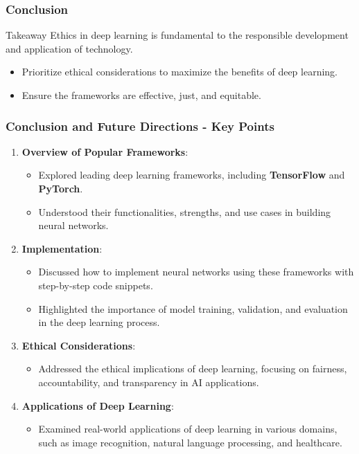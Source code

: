 \documentclass[aspectratio=169]{beamer}
\begin{document}
\begin{frame}[fragile]
    \frametitle{Conclusion}
    \begin{block}{Takeaway}
        Ethics in deep learning is fundamental to the responsible development and application of technology. 
        \begin{itemize}
            \item Prioritize ethical considerations to maximize the benefits of deep learning.
            \item Ensure the frameworks are effective, just, and equitable.
        \end{itemize}
    \end{block}
\end{frame}

\begin{frame}[fragile]
    \frametitle{Conclusion and Future Directions - Key Points}
    
    \begin{enumerate}
        \item \textbf{Overview of Popular Frameworks}:
        \begin{itemize}
            \item Explored leading deep learning frameworks, including \textbf{TensorFlow} and \textbf{PyTorch}.
            \item Understood their functionalities, strengths, and use cases in building neural networks.
        \end{itemize}

        \item \textbf{Implementation}:
        \begin{itemize}
            \item Discussed how to implement neural networks using these frameworks with step-by-step code snippets.
            \item Highlighted the importance of model training, validation, and evaluation in the deep learning process.
        \end{itemize}

        \item \textbf{Ethical Considerations}:
        \begin{itemize}
            \item Addressed the ethical implications of deep learning, focusing on fairness, accountability, and transparency in AI applications.
        \end{itemize}

        \item \textbf{Applications of Deep Learning}:
        \begin{itemize}
            \item Examined real-world applications of deep learning in various domains, such as image recognition, natural language processing, and healthcare.
        \end{itemize}
    \end{enumerate}
\end{frame}
\end{document}
